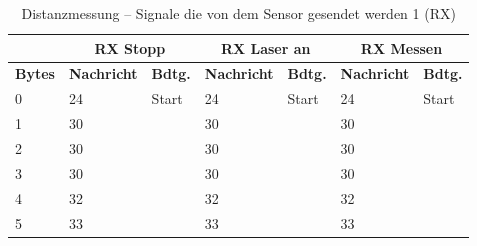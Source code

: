 \pagebreak[1]
\begin{table}[!ht]
	\centering
	\caption{Distanzmessung – Signale die von dem Sensor gesendet werden 1 (RX)}
	\label{Steuerung:tab:RX1}
	\begin{tabular}{lllllll}
		\hline
		                        & \multicolumn{2}{c}{RX Stopp} & \multicolumn{2}{c}{RX Laser an}                    & \multicolumn{2}{c}{RX Messen}                                                                                                                   \\ \hline
		\textbf{Bytes}          & \textbf{Nachricht}           & \textbf{Bdtg.}                                     & \textbf{Nachricht}            & \textbf{Bdtg.}                                     & \textbf{Nachricht}         & \textbf{Bdtg.}                \\ \hline
		\multicolumn{1}{l|}{0}  & \cellcolor[HTML]{9AFF99}24   & \multicolumn{1}{l|}{\cellcolor[HTML]{9AFF99}Start} & \cellcolor[HTML]{9AFF99}24    & \multicolumn{1}{l|}{\cellcolor[HTML]{9AFF99}Start} & \cellcolor[HTML]{9AFF99}24 & \cellcolor[HTML]{9AFF99}Start \\
		\multicolumn{1}{l|}{1}  & \cellcolor[HTML]{F8FF00}30   & \multicolumn{1}{l|}{\cellcolor[HTML]{F8FF00}}      & \cellcolor[HTML]{F8FF00}30    & \multicolumn{1}{l|}{\cellcolor[HTML]{F8FF00}}      & \cellcolor[HTML]{F8FF00}30 & \cellcolor[HTML]{F8FF00}      \\
		\multicolumn{1}{l|}{2}  & \cellcolor[HTML]{F8FF00}30   & \multicolumn{1}{l|}{\cellcolor[HTML]{F8FF00}}      & \cellcolor[HTML]{F8FF00}30    & \multicolumn{1}{l|}{\cellcolor[HTML]{F8FF00}}      & \cellcolor[HTML]{F8FF00}30 & \cellcolor[HTML]{F8FF00}      \\
		\multicolumn{1}{l|}{3}  & \cellcolor[HTML]{F8FF00}30   & \multicolumn{1}{l|}{\cellcolor[HTML]{F8FF00}}      & \cellcolor[HTML]{F8FF00}30    & \multicolumn{1}{l|}{\cellcolor[HTML]{F8FF00}}      & \cellcolor[HTML]{F8FF00}30 & \cellcolor[HTML]{F8FF00}      \\
		\multicolumn{1}{l|}{4}  & \cellcolor[HTML]{F8FF00}32   & \multicolumn{1}{l|}{\cellcolor[HTML]{F8FF00}}      & \cellcolor[HTML]{F8FF00}32    & \multicolumn{1}{l|}{\cellcolor[HTML]{F8FF00}}      & \cellcolor[HTML]{F8FF00}32 & \cellcolor[HTML]{F8FF00}      \\
		\multicolumn{1}{l|}{5}  & \cellcolor[HTML]{F8FF00}33   & \multicolumn{1}{l|}{\cellcolor[HTML]{F8FF00}}      & \cellcolor[HTML]{F8FF00}33    & \multicolumn{1}{l|}{\cellcolor[HTML]{F8FF00}}      & \cellcolor[HTML]{F8FF00}33 & \cellcolor[HTML]{F8FF00}      \\

\end{tabular}
\end{table}
